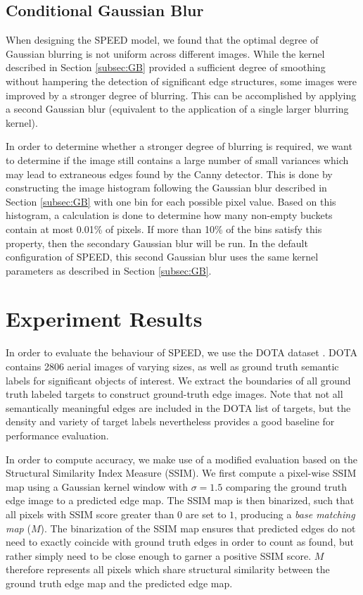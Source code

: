 \documentclass[conference]{IEEEtran}
\begin{document}
\subsection{Conditional Gaussian Blur}

When designing the SPEED model, we found that the optimal degree of Gaussian blurring is not uniform across different images. While the kernel described in Section \ref{subsec:GB} provided a sufficient degree of smoothing without hampering the detection of significant edge structures, some images were improved by a stronger degree of blurring. This can be accomplished by applying a second Gaussian blur (equivalent to the application of a single larger blurring kernel).

In order to determine whether a stronger degree of blurring is required, we want to determine if the image still contains a large number of small variances which may lead to extraneous edges found by the Canny detector. This is done by constructing the image histogram following the Gaussian blur described in Section \ref{subsec:GB} with one bin for each possible pixel value. Based on this histogram, a calculation is done to determine how many non-empty buckets contain at most 0.01\% of pixels. If more than 10\% of the bins satisfy this property, then the secondary Gaussian blur will be run. In the default configuration of SPEED, this second Gaussian blur uses the same kernel parameters as described in Section \ref{subsec:GB}.

\section{Experiment Results}
\label{sec:Experiments}

In order to evaluate the behaviour of SPEED, we use the DOTA dataset \cite{XiaEtAl2018}. DOTA contains 2806 aerial images of varying sizes, as well as ground truth semantic labels for significant objects of interest. We extract the boundaries of all ground truth labeled targets to construct ground-truth edge images. Note that not all semantically meaningful edges are included in the DOTA list of targets, but the density and variety of target labels nevertheless provides a good baseline for performance evaluation.

In order to compute accuracy, we make use of a modified evaluation based on the Structural Similarity Index Measure (SSIM). We first compute a pixel-wise SSIM map using a Gaussian kernel window with $\sigma=1.5$ comparing the ground truth edge image to a predicted edge map. The SSIM map is then binarized, such that all pixels with SSIM score greater than $0$ are set to $1$, producing a \emph{base matching map} ($M$). The binarization of the SSIM map ensures that predicted edges do not need to exactly coincide with ground truth edges in order to count as found, but rather simply need to be close enough to garner a positive SSIM score. $M$ therefore represents all pixels which share structural similarity between the ground truth edge map and the predicted edge map.
\end{document}
